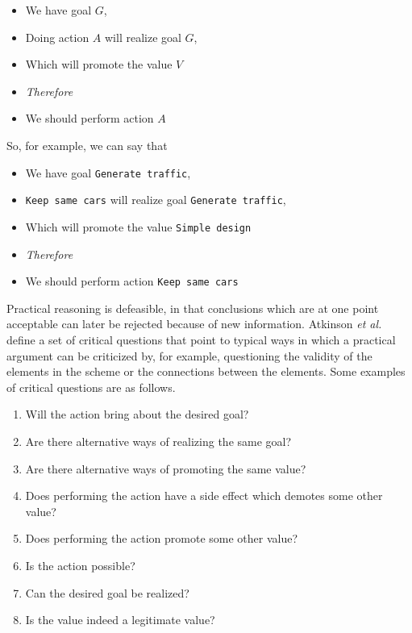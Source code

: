 \begin{itemize}
\item[] We have goal $G$,
\item[] Doing action $A$ will realize goal $G$,
\item[] Which will promote the value $V$
\item[] \textit{Therefore} 
\item[] We should perform action $A$
\end{itemize}

So, for example, we can say that 
\begin{itemize}
\item[] We have goal  \texttt{Generate traffic},
\item[]  \texttt{Keep same cars} will realize goal  \texttt{Generate traffic}, %
\item[] Which will promote the value  \texttt{Simple design} %
\item[] \textit{Therefore} 
\item[] We should perform action  \texttt{Keep same cars}
\end{itemize}

Practical reasoning is defeasible, in that conclusions which are at one point acceptable can later be rejected because of new information. Atkinson \emph{et al.}~\cite{atkinson2007} define a set of critical questions that point to typical ways in which a practical argument can be criticized by, for example, questioning the validity of the elements in the scheme or the connections between the elements. Some examples of critical questions are as follows.

\begin{enumerate}
\item Will the action bring about the desired goal?
\item Are there alternative ways of realizing the same goal?
\item Are there alternative ways of promoting the same value?
\item Does performing the action have a side effect which demotes some other value? %
\item Does performing the action promote some other value?
\item Is the action possible?
\item Can the desired goal be realized?
\item Is the value indeed a legitimate value?
\end{enumerate}

